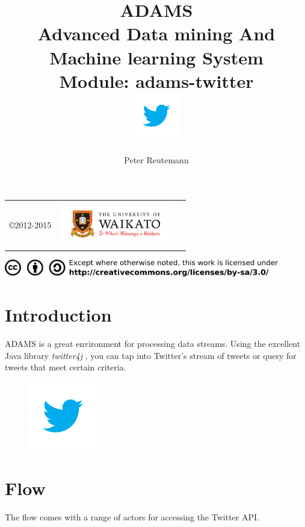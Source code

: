 \documentclass[a4paper]{book}
\title{
  \textbf{ADAMS} \\
  {\Large \textbf{A}dvanced \textbf{D}ata mining \textbf{A}nd \textbf{M}achine
  learning \textbf{S}ystem} \\
  {\Large Module: adams-twitter} \\
  \vspace{1cm}
  \includegraphics[width=2cm]{images/twitter-bird-blue-on-white.png} \\
}
\author{
  Peter Reutemann
}
\begin{document}
\begin{titlepage}
\maketitle

\thispagestyle{empty}
\center
\begin{table}[b]
	\begin{tabular}{c l l}
		\parbox[c][2cm]{2cm}{\copyright 2012-2015} &
		\parbox[c][2cm]{5cm}{\includegraphics[width=5cm]{images/coat_of_arms.pdf}} \\
	\end{tabular}
	\includegraphics[width=12cm]{images/cc.png} \\
\end{table}

\end{titlepage}

\tableofcontents
\listoffigures

\chapter{Introduction}
ADAMS is a great environment for processing data streams. Using the excellent
Java library \textit{twitter4j} \cite{twitter4j}, you can tap into Twitter's 
stream of tweets or query for tweets that meet certain criteria.

\begin{figure}[htb]
  \centering
  \includegraphics[width=3.0cm]{images/twitter-bird-blue-on-white.png}
\end{figure}

\chapter{Flow}
The flow comes with a range of actors for accessing the Twitter API.
\end{document}
